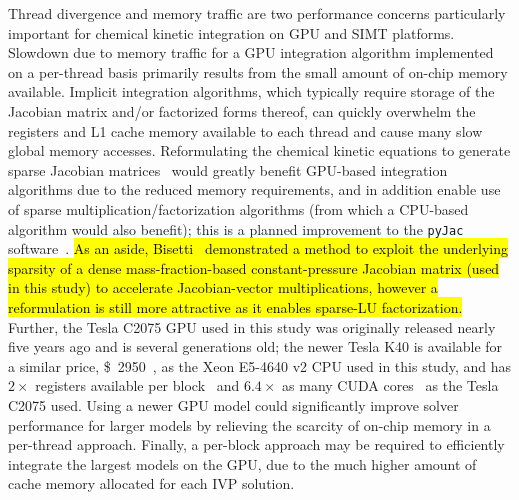 \documentclass[preprint,review,11pt]{elsarticle}
\DeclareRobustCommand{\hlb}[1]{\sethlcolor{SkyBlue}\hl{#1}}
\begin{document}
Thread divergence and memory traffic are two performance concerns particularly important for chemical kinetic integration on GPU and SIMT platforms.
Slowdown due to memory traffic for a GPU integration algorithm implemented on a per-thread basis primarily results from the small amount of on-chip memory available.
Implicit integration algorithms, which typically require storage of the Jacobian matrix and\slash or factorized forms thereof, can quickly overwhelm the registers and L1 cache memory available to each thread and cause many slow global memory accesses.
Reformulating the chemical kinetic equations to generate sparse Jacobian matrices~\cite{Schwer2002270} would greatly benefit GPU-based integration algorithms due to the reduced memory requirements, and in addition enable use of sparse multiplication\slash factorization algorithms (from which a CPU-based algorithm would also benefit); this is a planned improvement to the \texttt{pyJac} software~\cite{Niemeyer:2016aa,niemeyer_2016_51139}.
\hlb{As an aside, Bisetti~\cite{Bisetti:2012jw} demonstrated a method to exploit the underlying sparsity of a dense mass-fraction-based constant-pressure Jacobian matrix (used in this study) to accelerate Jacobian-vector multiplications, however a reformulation is still more attractive as it enables sparse-LU factorization.}
Further, the Tesla C2075 GPU used in this study was originally released nearly five years ago and is several generations old; the newer Tesla K40 is available for a similar price, \SI{2950}[\$]{}~\cite{k40_price}, as the Xeon E5-4640 v2 CPU used in this study, and has $2\times$ registers available per block~\cite{NVIDIA:2015aa} and $6.4\times$ as many CUDA cores~\cite{k40_specs} as the Tesla C2075 used.
Using a newer GPU model could significantly improve solver performance for larger models by relieving the scarcity of on-chip memory in a per-thread approach.
Finally, a per-block approach may be required to efficiently integrate the largest models on the GPU, due to the much higher amount of cache memory allocated for each IVP solution.
\end{document}
